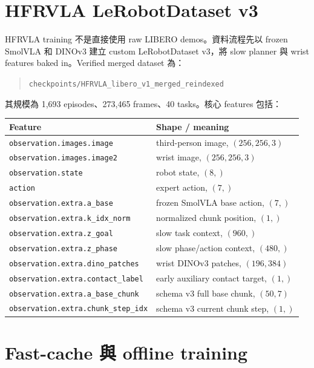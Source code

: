\documentclass[12pt,a4paper,oneside]{report}
\newcommand{\smolvla}{SmolVLA}
\begin{document}
\section{HFRVLA LeRobotDataset v3}

HFRVLA training 不是直接使用 raw LIBERO demos。資料流程先以 frozen \smolvla{} 和 DINOv3 建立 custom LeRobotDataset v3，將 slow planner 與 wrist features baked in。Verified merged dataset 為：
\begin{quote}
\texttt{checkpoints/HFRVLA\_libero\_v1\_merged\_reindexed}
\end{quote}
其規模為 1,693 episodes、273,465 frames、40 tasks。核心 features 包括：
\begin{center}
\begin{tabular}{@{}ll@{}}
\toprule
Feature & Shape / meaning \\
\midrule
\texttt{observation.images.image} & third-person image, $(256,256,3)$ \\
\texttt{observation.images.image2} & wrist image, $(256,256,3)$ \\
\texttt{observation.state} & robot state, $(8,)$ \\
\texttt{action} & expert action, $(7,)$ \\
\texttt{observation.extra.a\_base} & frozen \smolvla{} base action, $(7,)$ \\
\texttt{observation.extra.k\_idx\_norm} & normalized chunk position, $(1,)$ \\
\texttt{observation.extra.z\_goal} & slow task context, $(960,)$ \\
\texttt{observation.extra.z\_phase} & slow phase/action context, $(480,)$ \\
\texttt{observation.extra.dino\_patches} & wrist DINOv3 patches, $(196,384)$ \\
\texttt{observation.extra.contact\_label} & early auxiliary contact target, $(1,)$ \\
\texttt{observation.extra.a\_base\_chunk} & schema v3 full base chunk, $(50,7)$ \\
\texttt{observation.extra.chunk\_step\_idx} & schema v3 current chunk step, $(1,)$ \\
\bottomrule
\end{tabular}
\end{center}

\section{Fast-cache 與 offline training}
\end{document}
